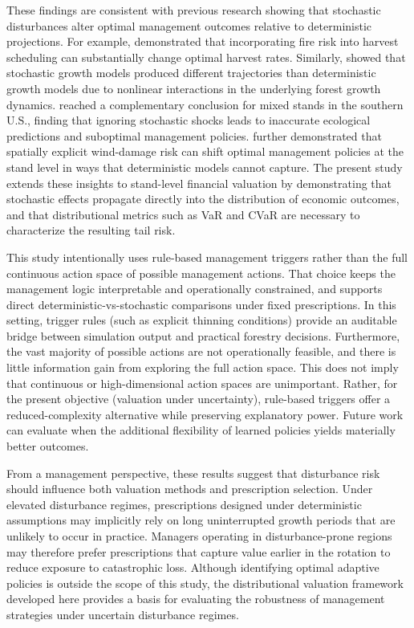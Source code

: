 \documentclass[12pt]{report}
\begin{document}
These findings are consistent with previous research showing that stochastic disturbances alter optimal management outcomes relative to 
deterministic projections. For example, \textcite{stevensOptimalHarvestRates1986} demonstrated that incorporating fire risk into harvest scheduling can substantially change 
optimal harvest rates. Similarly, \textcite{fortinStochasticDeterministicSingletree2012} showed that stochastic growth models produced different trajectories than deterministic 
growth models due to nonlinear interactions in the underlying forest growth dynamics. \textcite{buongiornoAdaptiveEconomicEcological2015} reached a complementary conclusion for mixed stands in the southern U.S., finding that ignoring stochastic shocks leads to inaccurate ecological predictions and suboptimal management policies. \textcite{forsellGraphbasedMarkovDecision2011} further demonstrated that spatially explicit wind-damage risk can shift optimal management policies at the stand level in ways that deterministic models cannot capture. The present study extends these insights to stand-level financial valuation by demonstrating 
that stochastic effects propagate directly into the distribution of economic outcomes, and that distributional metrics such as VaR and CVaR are necessary to characterize the resulting tail risk.

This study intentionally uses rule-based management triggers rather than the full continuous action space of possible
management actions. That choice keeps the management logic interpretable and operationally constrained, and 
supports direct deterministic-vs-stochastic comparisons under fixed prescriptions. In this setting, trigger rules 
(such as explicit thinning conditions) provide an auditable bridge between simulation output and practical forestry 
decisions. Furthermore, the vast majority of possible actions are not operationally feasible, and there is little 
information gain from exploring the full action space. This does not imply that continuous or high-dimensional action spaces are unimportant. Rather, for the present 
objective (valuation under uncertainty), rule-based triggers offer a reduced-complexity alternative while preserving 
explanatory power. Future work can evaluate when the additional flexibility of learned policies yields materially 
better outcomes.

From a management perspective, these results suggest that disturbance risk should influence both valuation methods and prescription selection. Under elevated 
disturbance regimes, prescriptions designed under deterministic assumptions may implicitly rely on long uninterrupted growth periods that are unlikely to occur 
in practice. Managers operating in disturbance-prone regions may therefore prefer prescriptions that capture value 
earlier in the rotation to reduce exposure to catastrophic loss. Although identifying optimal adaptive policies is 
outside the scope of this study, the distributional valuation framework developed here provides a basis for evaluating 
the robustness of management strategies under uncertain disturbance regimes.
\end{document}
